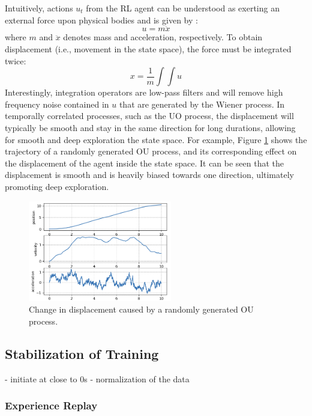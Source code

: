 Intuitively, actions $u_t$ from the RL agent can be understood as exerting an external force upon physical bodies and is given by \cite{physics}:
\begin{equation}
    u = m \ddot{x}
\end{equation}
where $m$ and  $\ddot{x}$ denotes mass and acceleration, respectively.  To obtain displacement (i.e., movement in the state space), the force must be integrated twice:
\begin{equation}
    x = \frac{1}{m}\int \int u
\end{equation}
Interestingly, integration operators are low-pass filters \cite{process_control_ref13} and will remove high frequency noise contained in $u$ that are generated by the Wiener process. In temporally correlated processes, such as the UO process, the displacement will typically be smooth and stay in the same direction for long durations, allowing for smooth and deep exploration the state space. For example, Figure \ref{fig:01OU} shows the trajectory of a randomly generated OU process, and its corresponding effect on the displacement of the agent inside the state space.  It can be seen that the displacement is smooth and is heavily biased towards one direction, ultimately promoting deep exploration.

\begin{figure}[H]
    \centering
    \includegraphics[width=0.56\textwidth]{images/ch1/01OU.jpeg}
    \caption{Change in displacement caused by a randomly generated OU process.}
    \label{fig:01OU}
\end{figure}   





\subsection{Stabilization of Training}
- initiate at close to 0s
- normalization of the data
\subsubsection{Experience Replay}
